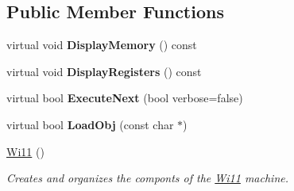 \subsection*{Public Member Functions}
\begin{DoxyCompactItemize}
\item 
\hypertarget{classWi11_a0f532cefdebd3c33ddc93e8bce4dc06b}{
virtual void {\bfseries DisplayMemory} () const }
\label{classWi11_a0f532cefdebd3c33ddc93e8bce4dc06b}

\item 
\hypertarget{classWi11_a201359b2506539dda72075b908076492}{
virtual void {\bfseries DisplayRegisters} () const }
\label{classWi11_a201359b2506539dda72075b908076492}

\item 
\hypertarget{classWi11_ace44826e4f92aabd233b68bdd9437c1b}{
virtual bool {\bfseries ExecuteNext} (bool verbose=false)}
\label{classWi11_ace44826e4f92aabd233b68bdd9437c1b}

\item 
\hypertarget{classWi11_a50af76350b3e72c75d42035582aeb321}{
virtual bool {\bfseries LoadObj} (const char $\ast$)}
\label{classWi11_a50af76350b3e72c75d42035582aeb321}

\item 
\hyperlink{classWi11_ad8e6d1a1e39832bdc650f2ca3cfa2d3e}{Wi11} ()
\begin{DoxyCompactList}\small\item\em Creates and organizes the componts of the \hyperlink{classWi11}{Wi11} machine. \item\end{DoxyCompactList}\end{DoxyCompactItemize}
